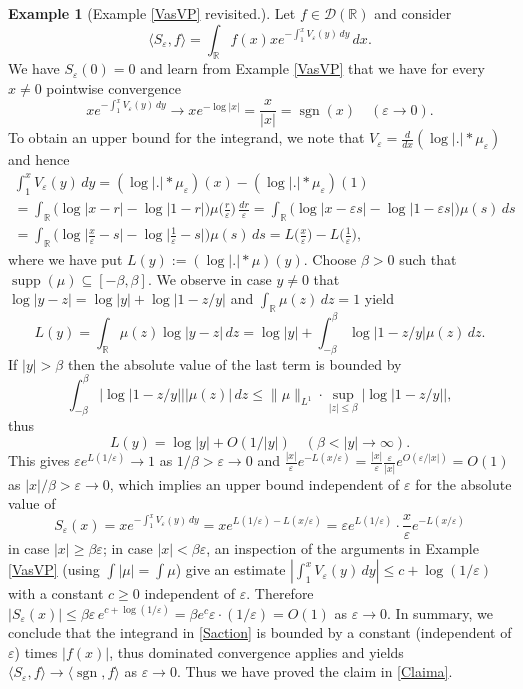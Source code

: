 \documentclass[sumlimits,intlimits,namelimits%
]{amsart}
\newcommand{\D}{\ensuremath{\mathcal{D}}}
\newcommand{\mb}[1]{\ensuremath{\mathbb{#1}}}
\newcommand{\R}{\mb{R}}
\newcommand{\sgn}{\mathop{\mathrm{sgn}}}
\newcommand{\diff}[1]{\frac{d}{d#1}}
\theoremstyle{definition}
\newtheorem{example}[theorem]{Example}
\newcommand{\beq}{\begin{equation}}
\newcommand{\eeq}{\end{equation}}
\newcommand{\dis}[2]{\langle #1 , #2 \rangle}
\newcommand{\be}{\beta}
\newcommand{\eps}{\varepsilon}
\newcommand{\supp}{\mathop{\mathrm{supp}}}
\begin{document}
\begin{example}[Example \ref{VasVP} revisited.]
Let $f \in \D(\R)$ and consider
\beq\label{Saction}
    \dis{S_\eps}{f} = \int_\R f(x) x e^{- \int_1^x V_\eps(y) \, dy} \,dx.
\eeq
We have $S_\eps(0) = 0$ and learn from Example \ref{VasVP} that we have for every $x \neq 0$ pointwise convergence  
$$
    x e^{- \int_1^x V_\eps(y) \, dy} \to x e^{- \log|x|} = \frac{x}{|x|} = \sgn(x) \quad (\eps \to 0).
$$
To obtain an upper bound for the integrand, we note that $V_\eps = \diff{x}(\log |.| * \mu_\eps)$ and hence 
\begin{multline*}
   \int_1^x V_\eps(y) \, dy = (\log |.| * \mu_\eps)(x) - (\log |.| * \mu_\eps)(1)\\ = 
   \int_\R \big(\log|x - r| - \log|1-r|\big) \mu\Big(\frac{r}{\eps}\Big) \,\frac{dr}{\eps}
   = \int_\R  \big(\log|x - \eps s| - \log|1- \eps s|\big) \mu(s) \,ds\\
   =  \int_\R  \Big(\log \Big|\frac{x}{\eps} - s\Big| - \log \Big|\frac{1}{\eps}- s \Big|\Big) \mu(s) \,ds 
   = L\Big(\frac{x}{\eps}\Big) - L\Big(\frac{1}{\eps}\Big),
\end{multline*}
where we have put $L(y) := (\log |.| * \mu)(y)$. Choose $\be > 0$ such that $\supp(\mu) \subseteq [-\be,\be]$. 
We observe in case $y \neq 0$ that $\log |y-z| = \log|y| + \log |1 - z/y|$ and $\int_\R \mu(z) \, dz = 1$ yield 
$$
   L(y) = \int_\R \mu(z) \log|y-z| \, dz = \log|y| + \int_{-\be}^\be \log|1 - z/y| \mu(z) \, dz.
$$
If $|y| > \be$ then the absolute value of the last term  is bounded by
$$
   \int_{-\be}^\be \Big| \log|1 - z/y| \Big| |\mu(z)| \, dz \leq \|\mu\|_{L^1} \cdot 
       \sup_{|z| \leq \be} |\log |1 - z/y| |,
$$
thus
$$
    L(y) = \log|y| + O(1/|y|) \quad (\be < |y| \to \infty).
$$
This gives $\eps e^{L(1/\eps)} \to 1$ as $1/\be > \eps \to 0$ and $\frac{|x|}{\eps} e^{- L(x/\eps)} = \frac{|x|}{\eps} \frac{\eps}{|x|} e^{O(\eps/|x|)} = O(1)$ as $|x|/\be > \eps \to 0$, which implies an upper bound independent of $\eps$ for the absolute value of
$$
    S_\eps(x) = x e^{- \int_1^x V_\eps(y) \, dy} = x e^{L(1/\eps)- L(x/\eps)}
    = \eps e^{L(1/\eps)} \cdot \frac{x}{\eps} e^{- L(x/\eps)}
$$
in case $|x| \geq \be \eps$; in case $|x| < \be \eps$, an inspection of the arguments in Example \ref{VasVP} (using $\int |\mu| = \int \mu$) give an estimate $\left| \int_1^x V_\eps(y) \, dy \right| \leq c + \log(1/\eps)$ with a constant $c \geq 0$ independent of $\eps$. Therefore $|S_\eps(x)| \leq \be \eps \, e^{c + \log(1/\eps)} = \be e^c \eps \cdot (1/ \eps) = O(1)$ as $\eps \to 0$. In summary, we conclude that the integrand in \eqref{Saction} is bounded by a constant (independent of $\eps$) times $|f(x)|$, thus dominated convergence applies and yields $ \dis{S_\eps}{f} \to  \dis{\sgn}{f}$ as $\eps \to 0$. Thus we have proved the claim in \eqref{Claima}.



\end{example}
\end{document}
